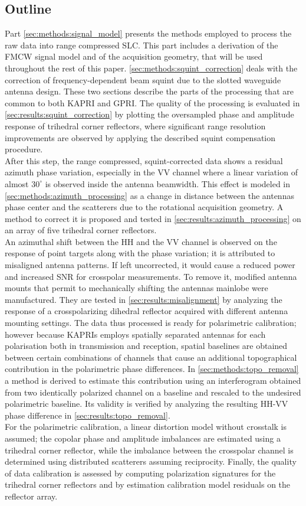 \subsection{Outline}
Part \ref{sec:methods:signal_model} presents  the methods employed to process the raw data into range compressed SLC. This part includes a derivation of the FMCW signal model and of the acquisition geometry, that will be used throughout the rest of this paper. \autoref{sec:methods:squint_correction} deals with the correction of frequency-dependent beam squint due to the slotted waveguide antenna design. These two sections describe the parts of the processing that are common to both KAPRI and GPRI. The quality of the processing is evaluated in \autoref{sec:results:squint_correction} by plotting the oversampled phase and amplitude response of trihedral corner reflectors, where significant range resolution improvements are observed by applying the described squint compensation procedure.\\
After this step, the range compressed, squint-corrected data shows a residual azimuth phase variation, especially in the VV channel where a linear variation of almost $30^\circ$ is observed inside the antenna beamwidth. This effect is modeled in \autoref{sec:methods:azimuth_processing} as a change in distance between the antennas phase center and the scatterers due to the rotational acquisition geometry. A method to correct it is proposed and tested in \autoref{sec:results:azimuth_processing} on an array of five trihedral corner reflectors.\\ An azimuthal shift between the HH and the VV channel is observed on the  response of point targets along with the phase variation; it is attributed to misaligned antenna patterns. If left uncorrected, it would cause a reduced power and increased SNR for crosspolar measurements. To remove it, modified antenna mounts that permit to mechanically shifting the antennas mainlobe were manufactured. They are tested in \autoref{sec:results:misalignment} by analyzing the response of a crosspolarizing dihedral reflector acquired with different antenna mounting settings.
The data thus processed is ready for polarimetric calibration; however because KAPRIs employs spatially separated antennas for each polarisation both in transmission and reception, spatial baselines are obtained between certain combinations of channels that cause an additional topographical contribution in the polarimetric phase differences. In \autoref{sec:methods:topo_removal} a method is derived to estimate this contribution using an interferogram obtained from two identically polarized channel on a baseline and rescaled to the undesired polarimetric baseline. Its validity is verified by analyzing the resulting HH-VV phase difference in \autoref{sec:results:topo_removal}.\\
For the polarimetric calibration, a linear distortion model without crosstalk is assumed; the copolar phase and amplitude imbalances are estimated using a trihedral corner reflector, while the imbalance between the crosspolar channel is determined using distributed scatterers assuming reciprocity. Finally, the quality of data calibration is assessed by computing polarization signatures for the trihedral corner reflectors and by estimation calibration model residuals on the reflector array. 